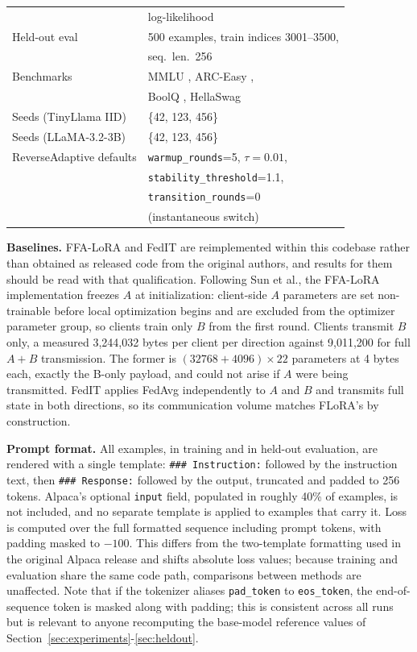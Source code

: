 \begin{table}[t]
\begin{center}
{\begin{tabular}{ll}
            & log-likelihood \\
Held-out eval & 500 examples, train indices 3001--3500, \\
            & seq.\ len.\ 256 \\
Benchmarks & MMLU \cite{hendrycks2020measuring}, ARC-Easy \cite{clark2018arc}, \\
            & BoolQ \cite{clark2019boolq}, HellaSwag \cite{zellers2019hellaswag} \\
Seeds (TinyLlama IID) & \{42, 123, 456\} \\
Seeds (LLaMA-3.2-3B) & \{42, 123, 456\} \\
ReverseAdaptive defaults & \texttt{warmup\_rounds}=5, $\tau{=}0.01$, \\
            & \texttt{stability\_threshold}=1.1, \\
            & \texttt{transition\_rounds}=0 \\
            & (instantaneous switch) \\
\bottomrule
\end{tabular}
}
\end{center}
\end{table}

\textbf{Baselines.} FFA-LoRA \cite{sun2024ffalora} and FedIT \cite{zhang2024federatedgpt} are reimplemented within this codebase rather than obtained as released code from the original authors, and results for them should be read with that qualification. Following Sun et al., the FFA-LoRA implementation freezes $A$ at initialization: client-side $A$ parameters are set non-trainable before local optimization begins and are excluded from the optimizer parameter group, so clients train only $B$ from the first round. Clients transmit $B$ only, a measured 3{,}244{,}032 bytes per client per direction against 9{,}011{,}200 for full $A{+}B$ transmission. The former is $(32768 + 4096) \times 22$ parameters at 4 bytes each, exactly the B-only payload, and could not arise if $A$ were being transmitted. FedIT applies FedAvg independently to $A$ and $B$ and transmits full state in both directions, so its communication volume matches FLoRA's by construction.

\textbf{Prompt format.} All examples, in training and in held-out evaluation, are rendered with a single template: \texttt{\#\#\# Instruction:} followed by the instruction text, then \texttt{\#\#\# Response:} followed by the output, truncated and padded to 256 tokens. Alpaca's optional \texttt{input} field, populated in roughly 40\% of examples, is not included, and no separate template is applied to examples that carry it. Loss is computed over the full formatted sequence including prompt tokens, with padding masked to $-100$. This differs from the two-template formatting used in the original Alpaca release and shifts absolute loss values; because training and evaluation share the same code path, comparisons between methods are unaffected. Note that if the tokenizer aliases \texttt{pad\_token} to \texttt{eos\_token}, the end-of-sequence token is masked along with padding; this is consistent across all runs but is relevant to anyone recomputing the base-model reference values of Section~\ref{sec:experiments}-\ref{sec:heldout}.

